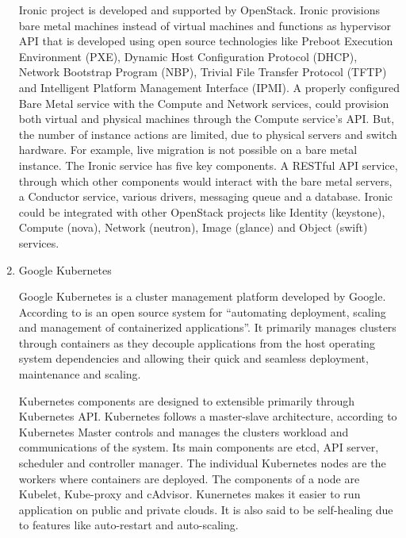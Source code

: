 \begin{enumerate}
Ironic \label{\detokenize{i524/technologies:id601}}{\hyperref[\detokenize{i524/technologies:www-ironicwebsite}]{\sphinxcrossref{{[}519{]}}}} project is developed and
supported by OpenStack. Ironic provisions bare metal machines
instead of virtual machines and functions as hypervisor API that
is developed using open source technologies like Preboot
Execution Environment (PXE), Dynamic Host Configuration Protocol
(DHCP), Network Bootstrap Program (NBP), Trivial File Transfer
Protocol (TFTP) and Intelligent Platform Management Interface
(IPMI). A properly configured Bare Metal service with the Compute
and Network services, could provision both virtual and physical
machines through the Compute service’s API. But, the number of
instance actions are limited, due to physical servers and switch
hardware. For example, live migration is not possible on a bare
metal instance. The Ironic service has five key components. A
RESTful API service, through which other components would
interact with the bare metal servers, a Conductor service,
various drivers, messaging queue and a database. Ironic could be
integrated with other OpenStack projects like Identity
(keystone), Compute (nova), Network (neutron), Image (glance) and
Object (swift) services.

\item {} 
Google Kubernetes

Google Kubernetes is a cluster management platform developed by
Google. According to \label{\detokenize{i524/technologies:id602}}{\hyperref[\detokenize{i524/technologies:www-kubernetesdoc}]{\sphinxcrossref{{[}520{]}}}} is an open source
system for ``automating deployment, scaling and management of
containerized applications''. It primarily manages clusters
through containers as they decouple applications from the
host operating system dependencies and allowing their quick and
seamless deployment, maintenance and scaling.

Kubernetes components are designed to extensible primarily
through Kubernetes API. Kubernetes follows a master-slave
architecture, according to \label{\detokenize{i524/technologies:id603}}{\hyperref[\detokenize{i524/technologies:www-kuberneteswiki}]{\sphinxcrossref{{[}521{]}}}} Kubernetes
Master controls and manages the clusters workload and
communications of the system. Its main components are etcd, API
server, scheduler and controller manager. The individual
Kubernetes nodes are the workers where containers are
deployed. The components of a node are Kubelet, Kube-proxy and
cAdvisor. Kunernetes makes it easier to run application on public
and private clouds. It is also said to be self-healing due to
features like auto-restart and auto-scaling.


\end{enumerate}

